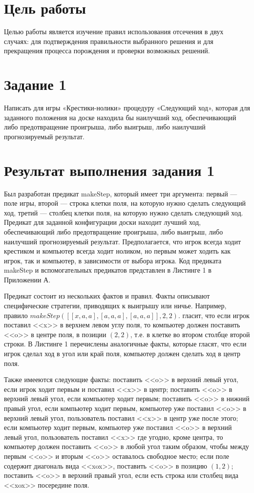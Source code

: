 \documentclass{article}
\begin{document}
\section*{Цель работы}
Целью работы является изучение правил использования отсечения в двух
случаях: для подтверждения правильности выбранного решения и для
прекращения процесса порождения и проверки возможных решений.
\section*{Задание 1}
Написать для игры «Крестики-нолики» процедуру «Следующий ход», которая
для заданного положения на доске находила бы наилучший ход,
обеспечивающий либо предотвращение проигрыша, либо выигрыш, либо
наилучший прогнозируемый результат.
\section*{Результат выполнения задания 1}
Был разработан предикат makeStep, который имеет три аргумента: первый
--- поле игры, второй --- строка клетки поля, на которую нужно сделать
следующий ход, третий --- столбец клетки поля, на которую нужно
сделать следующий ход. Предикат для заданной конфигурации доски
находит лучший ход, обеспечивающий либо предотвращение проигрыша, либо
выигрыш, либо наилучший прогнозируемый результат. Предполагается, что
игрок всегда ходит крестиком и компьютер всегда ходит ноликом, но
первым может ходить как игрок, так и компьютер, в зависимости от
выбора игрока. Код предиката makeStep и вспомогательных предикатов
представлен в Листинге 1 в Приложении А.

Предикат состоит из нескольких фактов и правил. Факты описывают
специфические стратегии, приводящих к выигрышу или ничье. Например,
правило \mbox{$makeStep([[x,a,a],[a,a,a],[a,a,a]], 2,2).$} гласит, что
если игрок поставил <<x>> в верхнем левом углу поля, то компьютер
должен поставить <<o>> в центре поля, в позиции $(2,2)$, т.е. в клетке
во втором столбце второй строки. В Листинге 1 перечислены аналогичные
факты, которые гласят, что если игрок сделал ход в угол или край
поля, компьютер должен сделать ход в центр поля.

Также имееются следующие факты: поставить <<o>> в верхний левый
угол, если игрок ходит первым и поставил <<x>> в центр; поставить
<<o>> в верхний левый угол, если компьютер ходит первым; поставить
<<o>> в нижний правый угол, если компьютер ходит первым, компьютер уже
поставил <<o>> в верхний левый угол, пользователь поставил <<x>> в
центр уже после этого; если компьютер ходит первым, компьютер уже
поставил <<o>> в верхний левый угол, пользователь поставил <<x>> где
угодно, кроме центра, то компьютер должен поставить <<o>> в любой угол
таким образом, чтобы между первым <<o>> и вторым <<o>> оставалось
свободное место; если поле содержит диагональ вида <<xox>>, поставить
<<o>> в позицию $(1,2)$; поставить <<o>> в верхний правый угол, если
есть строка или столбец вида <<xox>> посередине поля.
\end{document}
